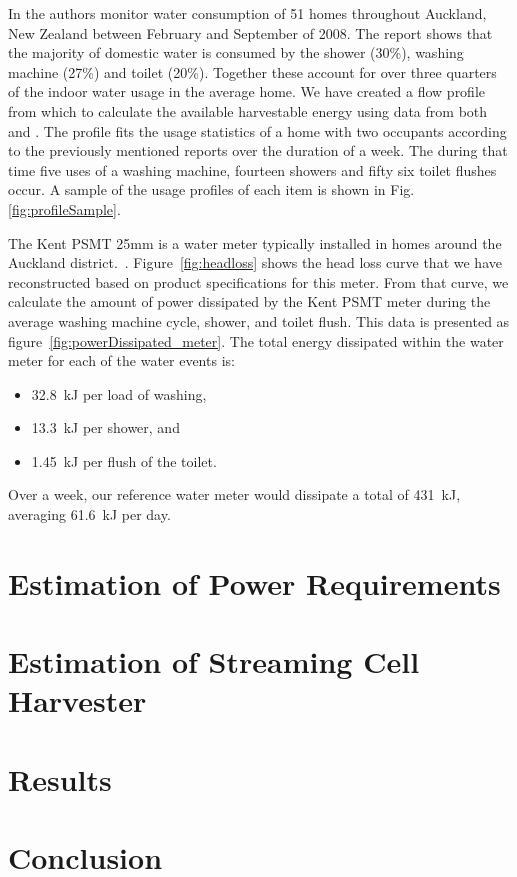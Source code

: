 \documentclass[10pt,final,journal]{IEEEtran}
\begin{document}
    In \cite{Heinrich2008} the authors monitor water consumption of 51 homes throughout Auckland, New Zealand between February and September of 2008.
    The report shows that the majority of domestic water is consumed by the shower (30\%), washing machine (27\%) and toilet (20\%).
    Together these account for over three quarters of the indoor water usage in the average home.
    We have created a flow profile from which to calculate the available harvestable energy using data from both \cite{Heinrich2008} and \cite{Heinrich2007}.
    The profile fits the usage statistics of a home with two occupants according to the previously mentioned reports over the duration of a week.
    The during that time five uses of a washing machine, fourteen showers and fifty six toilet flushes occur.
    A sample of the usage profiles of each item is shown in Fig. \ref{fig:profileSample}.

    The Kent PSMT 25mm is a water meter typically installed in homes around the Auckland district.~\cite{WatercareNewZealand2014}.
    Figure~\ref{fig:headloss} shows the head loss curve that we have reconstructed based on product specifications for this meter.
    From that curve, we calculate the amount of power dissipated by the Kent PSMT meter during the average washing machine cycle, shower, and toilet flush.
    This data is presented as figure~\ref{fig:powerDissipated_meter}.
    The total energy dissipated within the water meter for each of the water events is:
    \begin{itemize}
    \item \SI{32.8}{\kilo\joule} per load of washing,
    \item \SI{13.3}{\kilo\joule} per shower, and
    \item \SI{1.45}{\kilo\joule} per flush of the toilet.
    \end{itemize}
    Over a week, our reference water meter would dissipate a total of \SI{431}{\kilo\joule}, averaging \SI{61.6}{\kilo\joule} per day.
    
    \section{Estimation of Power Requirements}
    \label{sect:powerRequirements}

    
    \section{Estimation of Streaming Cell Harvester}
    \label{sect:harvesterSize}

    \section{Results}
    \label{sect:results}

    \section{Conclusion}
    
    
\end{document}
